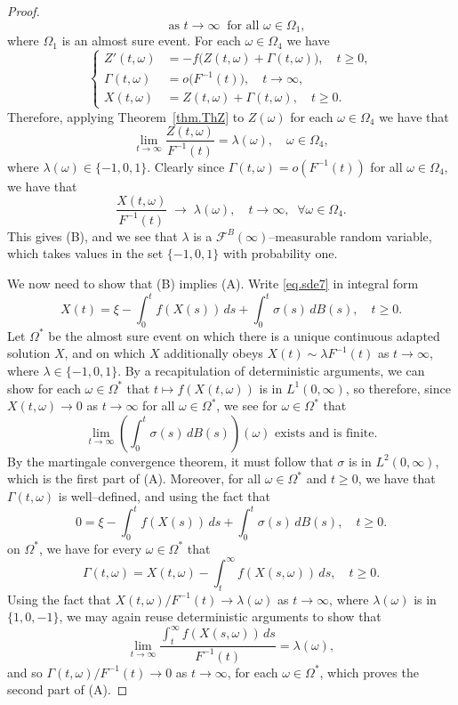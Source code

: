 \documentclass[a4paper,10pt,reqno]{amsart}
\numberwithin{equation}{section}
\theoremstyle{definition}
\theoremstyle{remark}
\DeclareMathOperator{\1}{\mathbbm 1}
\begin{document}
\begin{proof}
\[		\quad \text{as } t \to \infty \;\; \text{for all } \omega \in \Omega_1,
		\]
		where $\Omega_1$ is an almost sure event.  
		For each $\omega \in \Omega_4$ we have
		\[
		\left\{
		\begin{aligned}
			Z'(t,\omega) &= - f\big( Z(t,\omega) + \Gamma(t,\omega) \big), \quad t \geq 0, \\
			\Gamma(t,\omega) &= o\!\big(F^{-1}(t)\big), \quad t \to \infty, \\
			X(t,\omega) &= Z(t,\omega) + \Gamma(t,\omega), \quad t \geq 0.
		\end{aligned}
		\right.
		\]
		Therefore, applying Theorem~\ref{thm.ThZ} to $Z(\omega)$ for each $\omega\in \Omega_4$ we have that 
		\[
		\lim_{t \to \infty} \frac{Z(t,\omega)}{F^{-1}(t)} 
		= \lambda(\omega), \quad \omega \in \Omega_4,
		\]
		where $\lambda(\omega) \in \{-1,0,1\}$. Clearly  
		since $\Gamma(t,\omega) = o(F^{-1}(t))$ for all $\omega \in \Omega_4$, we have that
		\[
		\frac{X(t,\omega)}{F^{-1}(t)} \;\longrightarrow\; \lambda(\omega), 
		\quad t \to \infty, \;\; \forall \omega \in \Omega_4.
		\]
		This gives (B), and we see that $\lambda$ is a $\mathcal{F}^B(\infty)$--measurable random variable, which takes values in the set $\{-1,0,1\}$ with probability one.
		
		We now need to show that (B) implies (A). Write \eqref{eq.sde7} in integral form 
		\[
		X(t)=\xi-\int_0^t f(X(s))\,ds + \int_0^t \sigma(s)\,dB(s), \quad t\geq 0.
		\]
		Let $\Omega^\ast$ be the almost sure event on which there is a unique continuous adapted solution $X$, and on which $X$ additionally obeys $X(t)\sim \lambda F^{-1}(t)$ as $t\to\infty$, where $\lambda\in \{-1,0,1\}$. By a recapitulation of deterministic arguments, we can show for each $\omega\in \Omega^\ast$ that $t\mapsto f(X(t,\omega))$ is in $L^1(0,\infty)$, so therefore, since $X(t,\omega)\to 0$ as $t\to\infty$ for all $\omega\in \Omega^\ast$, we see for $\omega\in \Omega^\ast$ that 
		\[
		\lim_{t\to\infty} \left(\int_0^t \sigma(s)\,dB(s)\right)(\omega) \text{ exists and is finite}.
		\] 
		By the martingale convergence theorem, it must follow that $\sigma$ is in $L^2(0,\infty)$, which is the first part of (A). Moreover, for all $\omega\in\Omega^\ast$ and $t\geq 0$, we have that $\Gamma(t,\omega)$ is well--defined, and using the fact that \[
		0=\xi-\int_0^t f(X(s))\,ds + \int_0^t \sigma(s)\,dB(s), \quad t\geq 0.
		\] 
		on $\Omega^\ast$, we have for every $\omega\in \Omega^\ast$ that 
		\[
		\Gamma(t,\omega)=X(t,\omega)-\int_{t}^\infty f(X(s,\omega))\,ds, \quad t\geq 0.
		\]
		Using the fact that $X(t,\omega)/F^{-1}(t)\to \lambda(\omega)$ as $t\to\infty$, where $\lambda(\omega)$ is in $\{1,0,-1\}$, we may again reuse deterministic arguments to show that 
		\[
		\lim_{t\to\infty} \frac{\int_t^\infty f(X(s,\omega))\,ds}{F^{-1}(t)}=\lambda(\omega),
		\]
		and so $\Gamma(t,\omega)/F^{-1}(t)\to 0$ as $t\to\infty$, for each $\omega\in \Omega^\ast$, which proves the second part of (A).
	\end{proof} 
	
\end{document}
